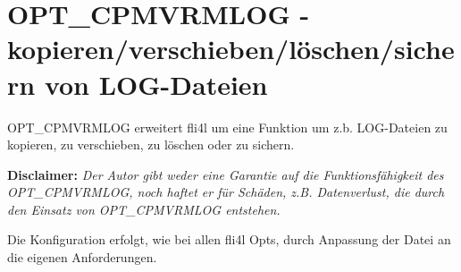 \section {OPT\_CPMVRMLOG - kopieren/verschieben/löschen/sichern von LOG-Dateien}

OPT\_CPMVRMLOG erweitert fli4l um eine Funktion um z.b. LOG-Dateien zu kopieren,
zu verschieben, zu löschen oder zu sichern.


\textbf{Disclaimer: }\emph{Der Autor gibt weder eine Garantie auf die
Funktionsfähigkeit des OPT\_\-CPMVRMLOG, noch haftet er für Schäden, z.B.
Datenverlust, die durch den Einsatz von OPT\_\-CPMVRMLOG entstehen.}



Die Konfiguration erfolgt, wie bei allen fli4l Opts, durch Anpassung der Datei
 an die eigenen Anforderungen.


